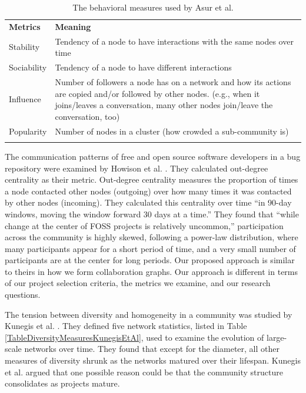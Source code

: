 \documentclass[11pt]{report}
\begin{document}
\begin{table}[!htbp]
\caption{The behavioral measures used by Asur et al. \cite{Asur}}
\label{tableDiversityMeasuresAsurEtAl} 
\begin{tabular}{p{} p{}}
\hline\noalign{\smallskip}
\textbf{Metrics} & \textbf{Meaning} \\
\noalign{\smallskip}\hline\noalign{\smallskip}
Stability & Tendency of a node to have interactions with the same nodes over time \\ \hline
Sociability & Tendency of a node to have different interactions \\\hline
Influence & Number of followers a node has on a network and how its actions are copied and/or followed by other nodes. (e.g., when it joins/leaves a conversation, many other nodes join/leave the conversation, too) \\\hline
Popularity & Number of nodes in a cluster (how crowded a sub-community is) \\
\noalign{\smallskip}\hline
\end{tabular}
\end{table}

The communication patterns of free and open source software developers in a bug repository were examined by Howison et al. \cite{HowisonSocialDynamics}. They calculated out-degree centrality as their metric. Out-degree centrality measures the proportion of times a node contacted other nodes (outgoing) over how many times it was contacted by other nodes (incoming). They calculated this centrality over time ``in 90-day windows, moving the window forward 30 days at a time.'' They found that ``while change at the center of FOSS projects is relatively uncommon,'' participation across the community is highly skewed, following a power-law distribution, where many participants appear for a short period of time, and a very small number of participants are at the center for long periods. Our proposed approach is similar to theirs in how we form collaboration graphs. Our approach is different in terms of our project selection criteria, the metrics we examine, and our research questions.

The tension between diversity and homogeneity in a community was studied by Kunegis et al. \cite{Kunegis}. They defined five network statistics, listed in Table \ref{TableDiversityMeasuresKunegisEtAl}, used to examine the evolution of large-scale networks over time. They found that except for the diameter, all other measures of diversity shrunk as the networks matured over their lifespan. Kunegis et al. \cite{Kunegis} argued that one possible reason could be that the community structure consolidates as projects mature.
\end{document}

